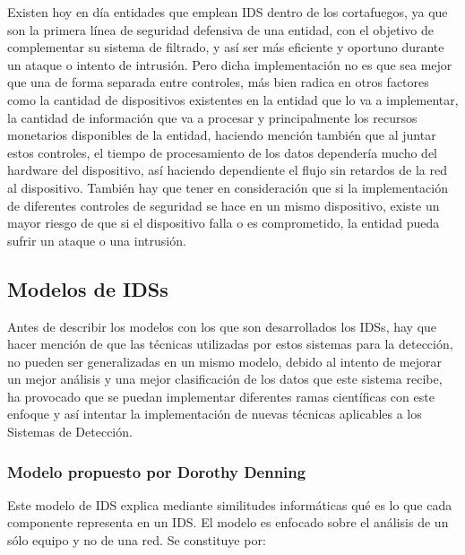 Existen hoy en día entidades que emplean IDS dentro de los cortafuegos, ya que son la primera línea de seguridad defensiva de una entidad, con el objetivo de complementar su sistema de filtrado, y así ser más eficiente y oportuno durante un ataque o intento de intrusión. Pero dicha implementación no es que sea mejor que una de forma separada entre controles, más bien radica en otros factores como la cantidad de dispositivos existentes en la entidad que lo va a implementar, la cantidad de información que va a procesar y principalmente los recursos monetarios disponibles de la entidad, haciendo mención también que al juntar estos controles, el tiempo de procesamiento de los datos dependería mucho del hardware del dispositivo, así haciendo dependiente el flujo sin retardos de la red al dispositivo. También hay que tener en consideración que si la implementación de diferentes controles de seguridad se hace en un mismo dispositivo, existe un mayor riesgo de que si el dispositivo falla o es comprometido, la entidad pueda sufrir un ataque o una intrusión. 
\\


\subsection{Modelos de IDSs}

Antes de describir los modelos con los que son desarrollados los IDSs, hay que hacer mención de que las técnicas utilizadas por estos sistemas para la detección, no pueden ser generalizadas en un mismo modelo, debido al intento de mejorar un mejor análisis y una mejor clasificación de los datos que este sistema recibe, ha provocado que se puedan implementar diferentes ramas científicas con este enfoque y así intentar la implementación de nuevas técnicas aplicables a los Sistemas de Detección.\\ 

\subsubsection{Modelo propuesto por Dorothy Denning}
	
	Este modelo de IDS explica mediante similitudes informáticas qué es lo que cada componente representa en un IDS. El modelo es enfocado sobre el análisis de un sólo equipo y no de una red. Se constituye por:\\

